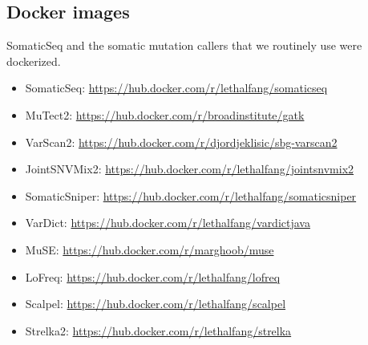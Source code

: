 \documentclass[10pt,letterpaper]{article}
\begin{document}
\begin{sloppypar}
\begin{enumerate}
\end{enumerate}






\subsection{Docker images}

SomaticSeq and the somatic mutation callers that we routinely use were dockerized. 

\begin{itemize}

  \item SomaticSeq:    \href{https://hub.docker.com/r/lethalfang/somaticseq}{https://hub.docker.com/r/lethalfang/somaticseq}
  
  \item MuTect2:       \href{https://hub.docker.com/r/broadinstitute/gatk}{https://hub.docker.com/r/broadinstitute/gatk}

  \item VarScan2:      \href{https://hub.docker.com/r/djordjeklisic/sbg-varscan2}{https://hub.docker.com/r/djordjeklisic/sbg-varscan2}

  \item JointSNVMix2:  \href{https://hub.docker.com/r/lethalfang/jointsnvmix2}{https://hub.docker.com/r/lethalfang/jointsnvmix2}

  \item SomaticSniper: \href{https://hub.docker.com/r/lethalfang/somaticsniper}{https://hub.docker.com/r/lethalfang/somaticsniper}

  \item VarDict:       \href{https://hub.docker.com/r/lethalfang/vardictjava}{https://hub.docker.com/r/lethalfang/vardictjava}

  \item MuSE:          \href{https://hub.docker.com/r/marghoob/muse}{https://hub.docker.com/r/marghoob/muse}

  \item LoFreq:        \href{https://hub.docker.com/r/lethalfang/lofreq}{https://hub.docker.com/r/lethalfang/lofreq}

  \item Scalpel:       \href{https://hub.docker.com/r/lethalfang/scalpel}{https://hub.docker.com/r/lethalfang/scalpel}

  \item Strelka2:      \href{https://hub.docker.com/r/lethalfang/strelka}{https://hub.docker.com/r/lethalfang/strelka}


\end{itemize}
\end{sloppypar}
\end{document}
